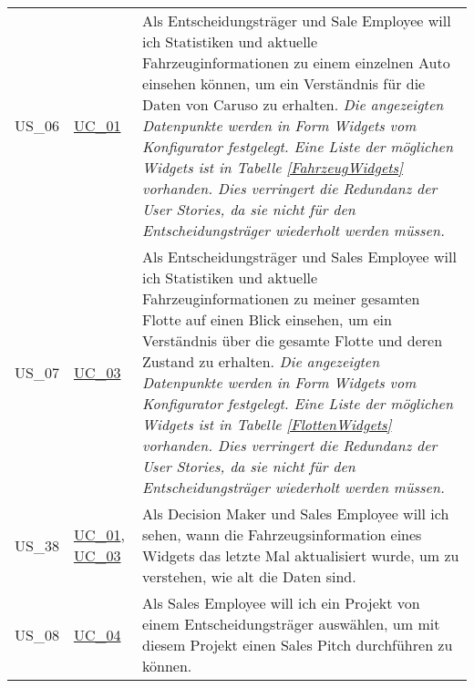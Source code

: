 \begin{footnotesize}
\begin{longtable}[L L L]{ p{} p{} p{} }
      \hypertarget{Ref:US6}{US\_06} & \hyperlink{Ref:UC1}{UC\_01} & Als Entscheidungsträger und Sale Employee will ich Statistiken und aktuelle Fahrzeuginformationen zu einem einzelnen Auto einsehen können, um ein Verständnis für die Daten von Caruso zu erhalten. 
      \newline\newline
      \emph{Die angezeigten Datenpunkte werden in Form Widgets vom Konfigurator festgelegt. Eine Liste der möglichen Widgets ist in Tabelle \ref{FahrzeugWidgets} vorhanden. Dies verringert die Redundanz der User Stories, da sie nicht für den Entscheidungsträger wiederholt werden müssen.}
      \\
      \hypertarget{Ref:US7}{US\_07} & \hyperlink{Ref:UC3}{UC\_03} & Als Entscheidungsträger und Sales Employee will ich Statistiken und aktuelle Fahrzeuginformationen zu meiner gesamten Flotte auf einen Blick einsehen, um ein Verständnis über die gesamte Flotte und deren Zustand zu erhalten.
      \newline\newline
      \emph{Die angezeigten Datenpunkte werden in Form Widgets vom Konfigurator festgelegt. Eine Liste der möglichen Widgets ist in Tabelle \ref{FlottenWidgets} vorhanden. Dies verringert die Redundanz der User Stories, da sie nicht für den Entscheidungsträger wiederholt werden müssen.} \\
      \hypertarget{Ref:US38}{US\_38} & \hyperlink{Ref:UC1}{UC\_01}, \newline \hyperlink{Ref:UC3}{UC\_03} & Als Decision Maker und Sales Employee  will ich sehen, wann die Fahrzeugsinformation eines Widgets das letzte Mal aktualisiert wurde, um zu verstehen, wie alt die Daten sind. \\
      \hypertarget{Ref:US8}{US\_08} & \hyperlink{Ref:UC4}{UC\_04} & Als Sales Employee will ich ein Projekt von einem Entscheidungsträger auswählen, um mit diesem Projekt einen Sales Pitch durchführen zu können. \\
      \bottomrule
    \end{longtable}
  \end{footnotesize}
  \rmfamily

